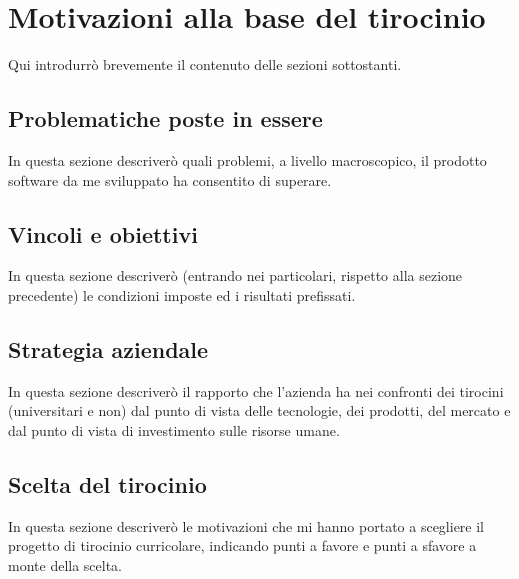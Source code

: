 \chapter{Motivazioni alla base del tirocinio}
\label{cap:motivazioni-tirocinio}
Qui introdurrò brevemente il contenuto delle sezioni sottostanti.

\section{Problematiche poste in essere}

In questa sezione descriverò quali problemi, a livello macroscopico, il prodotto software da me sviluppato ha consentito di superare.

\section{Vincoli e obiettivi}

In questa sezione descriverò (entrando nei particolari, rispetto alla sezione precedente) le condizioni imposte ed i risultati prefissati.

\section{Strategia aziendale}

In questa sezione descriverò il rapporto che l'azienda ha nei confronti dei tirocini (universitari e non) dal punto di vista delle tecnologie, dei prodotti, del mercato e dal punto di vista di investimento sulle risorse umane.

\section{Scelta del tirocinio}

In questa sezione descriverò le motivazioni che mi hanno portato a scegliere il progetto di tirocinio curricolare, indicando punti a favore e punti a sfavore a monte della scelta.